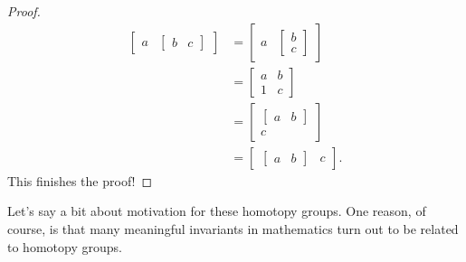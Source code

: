 \documentclass[../notes.tex]{subfiles}
\begin{document}
\begin{proof}
	\begin{align*}
		\begin{bmatrix}
			a & \begin{bmatrix}
				b & c
			\end{bmatrix}
		\end{bmatrix} &= \begin{bmatrix}
			a & \begin{bmatrix}
				b \\ c
			\end{bmatrix}
		\end{bmatrix} \\
		&= \begin{bmatrix}
			a & b \\
			1 & c
		\end{bmatrix} \\
		&= \begin{bmatrix}
			\begin{bmatrix}
				a & b
			\end{bmatrix} \\
			c
		\end{bmatrix} \\
		&= \begin{bmatrix}
			\begin{bmatrix}
				a & b
			\end{bmatrix} & c
		\end{bmatrix}.
	\end{align*}
	This finishes the proof!
\end{proof}
\begin{remark}
	Let's say a bit about motivation for these homotopy groups. One reason, of course, is that many meaningful invariants in mathematics turn out to be related to homotopy groups.
\end{remark}
\end{document}
